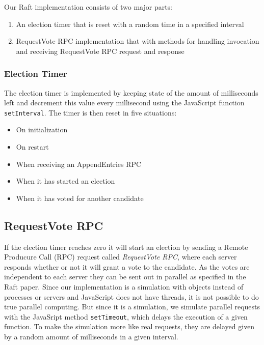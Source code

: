 Our Raft implementation consists of two major parts:

\begin{enumerate}
  \item An election timer that is reset with a random time in a specified interval
  \item RequestVote RPC implementation that with methods for handling invocation and receiving RequestVote RPC request and response
\end{enumerate}

\subsubsection{Election Timer} %
\label{ssub:election_timer}

The election timer is implemented by keeping state of the amount of milliseconds left and decrement this value every millisecond using the JavaScript function \verb$setInterval$. The timer is then reset in five situations:

\begin{itemize}
  \item On initialization
  \item On restart
  \item When receiving an AppendEntries RPC
  \item When it has started an election
  \item When it has voted for another candidate
\end{itemize}


\subsection{RequestVote RPC} %
\label{sub:requestvote_rpc}

If the election timer reaches zero it will start an election by sending a Remote Producure Call (RPC) request called \emph{RequestVote RPC}, where each server responds whether or not it will grant a vote to the candidate. As the votes are independent to each server they can be sent out in parallel as specified in the Raft paper. Since our implementation is a simulation with objects instead of processes or servers and JavaScript does not have threads, it is not possible to do true parallel computing. But since it is a simulation, we simulate parallel requests with the JavaSript method \verb$setTimeout$, which delays the execution of a given function. To make the simulation more like real requests, they are delayed given by a random amount of milliseconds in a given interval.

